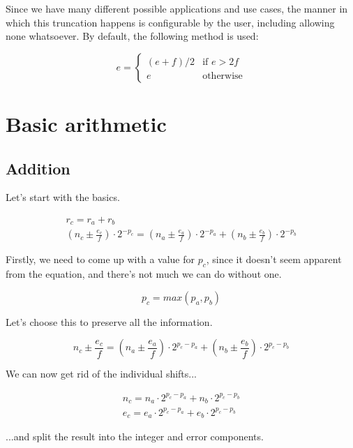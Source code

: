 \documentclass[10pt,a4paper]{article}
\numberwithin{equation}{section}
\numberwithin{equation}{subsection}
\begin{document}
	Since we have many different possible applications and use cases, the manner in which this truncation happens is configurable by the user, including allowing none whatsoever. By default, the following method is used:
	
	\begin{equation}
	e = \begin{cases}
	(e+f)/2 & \text{if } e>2f\\
	e & \text{otherwise}
	\end{cases}
	\end{equation}
	
	\section{Basic arithmetic}
	
	\subsection{Addition}
	
	Let's start with the basics.
	
	\begin{eqnarray}
	r_c = r_a + r_b \\
	(n_c \pm \frac{e_c}{f})\cdot 2^{-p_c} = (n_a \pm \frac{e_a}{f})\cdot 2^{-p_a} + (n_b \pm \frac{e_b}{f})\cdot 2^{-p_b}
	\end{eqnarray}
	
	Firstly, we need to come up with a value for $p_c$, since it doesn't seem apparent from the equation, and there's not much we can do without one. 
	
	\begin{equation}
	p_c = max(p_a, p_b)
	\end{equation}
	
	Let's choose this to preserve all the information.
	
	\begin{equation}
	n_c \pm \frac{e_c}{f} = (n_a \pm \frac{e_a}{f})\cdot 2^{p_c-p_a} + (n_b \pm \frac{e_b}{f})\cdot 2^{p_c-p_b}
	\end{equation}
	
	We can now get rid of the individual shifts...
	
	\begin{eqnarray}
	n_c = n_a\cdot 2^{p_c-p_a} + n_b\cdot 2^{p_c-p_b} \\
	e_c = e_a\cdot 2^{p_c-p_a} + e_b\cdot 2^{p_c-p_b}
	\end{eqnarray}
	
	...and split the result into the integer and error components.
	
\end{document}
